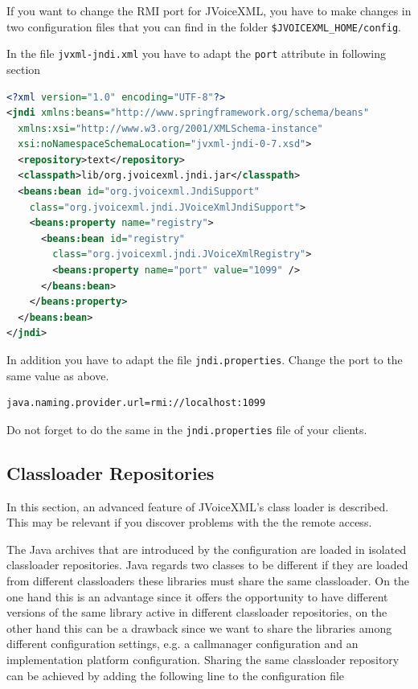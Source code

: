 \documentclass[11pt,a4paper]{article}
\begin{document}
If you want to change the RMI port for JVoiceXML, you have to make changes in 
two configuration files that you can find in the folder 
\texttt{\$JVOICE\-XML\_HOME/config}.

In the file \texttt{jvxml-jndi.xml} you have to adapt the \texttt{port} 
attribute in following section

\begin{lstlisting}[language=XML]
<?xml version="1.0" encoding="UTF-8"?>
<jndi xmlns:beans="http://www.springframework.org/schema/beans"
  xmlns:xsi="http://www.w3.org/2001/XMLSchema-instance"
  xsi:noNamespaceSchemaLocation="jvxml-jndi-0-7.xsd">
  <repository>text</repository>
  <classpath>lib/org.jvoicexml.jndi.jar</classpath>
  <beans:bean id="org.jvoicexml.JndiSupport"
    class="org.jvoicexml.jndi.JVoiceXmlJndiSupport">
    <beans:property name="registry">
      <beans:bean id="registry"
        class="org.jvoicexml.jndi.JVoiceXmlRegistry">
        <beans:property name="port" value="1099" />
      </beans:bean>
    </beans:property>
  </beans:bean>
</jndi>
\end{lstlisting}

In addition you have to adapt the file \texttt{jndi.properties}.
Change the port to the same value as above.

\begin{lstlisting}
java.naming.provider.url=rmi://localhost:1099
\end{lstlisting}

Do not forget to do the same in the \texttt{jndi.properties} file of your
clients.

\subsection{Classloader Repositories}

In this section, an advanced feature of JVoiceXML's class loader is described.
This may be relevant if you discover problems with the the remote access.

The Java archives that are introduced by the configuration are loaded
in isolated classloader repositories. Java regards two classes to be different if they are
loaded from different classloaders these libraries must share the same
classloader. On the one hand this is an advantage since it offers the opportunity
to have different versions of the same library active in different classloader
repositories, on the other hand this can be a drawback since we want to share the
libraries among different configuration settings, e.g. a callmanager
configuration and an implementation platform configuration. Sharing the same
classloader repository can be achieved by adding the following line to the
configuration file
\end{document}

